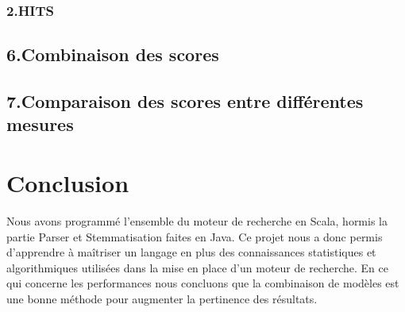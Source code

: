 \documentclass[a4paper,11pt]{report}
\begin{document}
\subsection*{2.HITS}

\section*{6.Combinaison des scores}

\section*{7.Comparaison des scores entre différentes mesures}


\chapter*{Conclusion}
Nous avons programmé l'ensemble du moteur de recherche en Scala, hormis la partie Parser et Stemmatisation faites en Java. Ce projet nous a donc permis d'apprendre à maîtriser un langage en plus des connaissances statistiques et algorithmiques utilisées dans la mise en place d'un moteur de recherche. En ce qui concerne les performances nous concluons que la combinaison de modèles est une bonne méthode pour augmenter la pertinence des résultats. 












\end{document}
